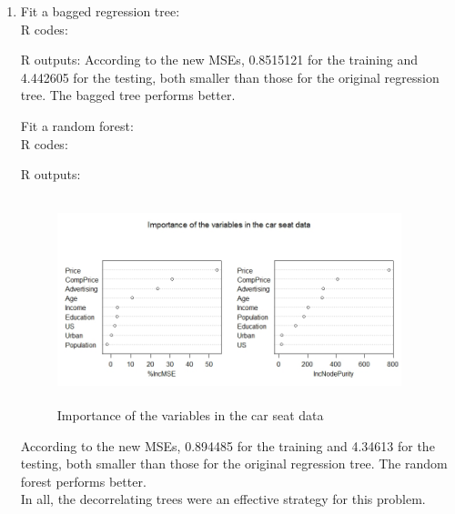 \documentclass[10pt]{article}
\begin{document}
\begin{enumerate}[1)]
\item
Fit a bagged regression tree:\\
R codes:

R outputs:
According to the new MSEs, 0.8515121 for the training and 4.442605 for the testing, both smaller than those for the original regression tree. The bagged tree performs better.
\vspace{3mm}

Fit a random forest:\\
R codes:

R outputs:
\begin{figure}[H]
  \centering
  \includegraphics[width=10cm,height=6cm]{p13a.jpeg}
  \caption{Importance of the variables in the car seat data}
\end{figure}
According to the new MSEs, 0.894485 for the training and 4.34613 for the testing, both smaller than those for the original regression tree. The random forest performs better.\\
In all, the decorrelating trees were an effective strategy for this problem. %
\vspace{3mm}


\end{enumerate}
\end{document}
